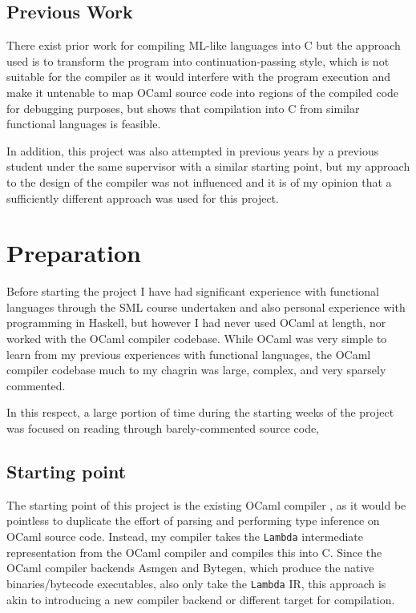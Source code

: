 \documentclass[12pt,a4paper,twoside,openright]{report}
\begin{document}
\section{Previous Work}

There exist prior work for compiling ML-like languages into C \cite{noassemblyrequired} but the approach used is to transform the program into continuation-passing style, which is not suitable for the compiler as it would interfere with the program execution and make it untenable to map OCaml source code into regions of the compiled code for debugging purposes, but shows that compilation into C from similar functional languages is feasible.

In addition, this project was also attempted in previous years by a previous student \cite{previousproject} under the same supervisor with a similar starting point, but my approach to the design of the compiler was not influenced and it is of my opinion that a sufficiently different approach was used for this project.

\chapter{Preparation}

Before starting the project I have had significant experience with functional 
languages through the SML course undertaken and also personal experience with 
programming in Haskell, but however I had never used OCaml at length, nor 
worked with the OCaml compiler codebase. While OCaml was very simple to learn 
from my previous experiences with functional languages, the OCaml compiler 
codebase much to my chagrin was large, complex, and very sparsely commented.

In this respect, a large portion of time during the starting weeks of the 
project was focused on reading through barely-commented source code, 

\section{Starting point}

The starting point of this project is the existing OCaml compiler \cite{ocamlcompiler}, as it would be pointless to duplicate the effort of parsing and performing type inference on OCaml source code. Instead, my compiler takes the \texttt{Lambda} intermediate representation from the OCaml compiler and compiles this into C. Since the OCaml compiler backends Asmgen and Bytegen, which produce the native binaries/bytecode executables, also only take the \texttt{Lambda} IR, this approach is akin to introducing a new compiler backend or different target for compilation.
\end{document}

